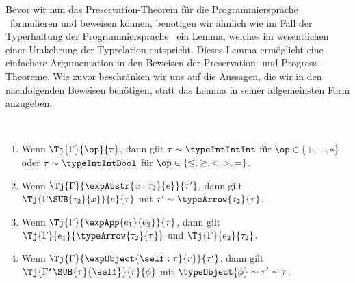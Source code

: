 Bevor wir nun das Preservation-Theorem f\"ur die Programmiersprache \Lort\ formulieren und beweisen k\"onnen,
ben\"otigen wir \"ahnlich wie im Fall der Typerhaltung der Programmiersprache \Losub\ ein Lemma, welches im
wesentlichen einer Umkehrung der Typrelation entspricht. Dieses Lemma erm\"oglicht eine einfachere Argumentation
in den Beweisen der Preservation- und Progress-Theoreme. Wie zuvor beschr\"anken wir uns auf die Aussagen, die
wir in den nachfolgenden Beweisen ben\"otigen, statt das Lemma in seiner allgemeinsten Form anzugeben.

\begin{lemma} \label{lemma:Lort:Umkehrung_der_Typrelation} \
  \begin{enumerate}
    \item Wenn $\Tj{\Gamma}{\op}{\tau}$, dann gilt $\tau \sim \typeIntIntInt$ f\"ur $\op\in\{+,-,*\}$
          oder $\tau \sim \typeIntIntBool$ f\"ur $\op\in\{\le,\ge,<,>,=\}$.
    \item Wenn $\Tj{\Gamma}{\expAbstr{x:\tau_2}{e}}{\tau'}$, dann gilt $\Tj{\Gamma\SUB{\tau_2}{x}}{e}{\tau}$
          mit $\tau' \sim \typeArrow{\tau_2}{\tau}$.
    \item Wenn $\Tj{\Gamma}{\expApp{e_1}{e_2}}{\tau}$, dann gilt $\Tj{\Gamma}{e_1}{\typeArrow{\tau_2}{\tau}}$
          und $\Tj{\Gamma}{e_2}{\tau_2}$.
    \item Wenn $\Tj{\Gamma}{\expObject{\self:\tau}{r}}{\tau'}$, dann gilt $\Tj{\Gamma^\star\SUB{\tau}{\self}}{r}{\phi}$
          mit $\typeObject{\phi} \sim \tau' \sim \tau$.
  \end{enumerate}
\end{lemma}


